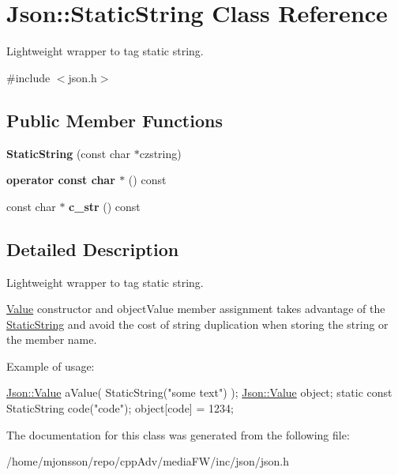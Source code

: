 \hypertarget{classJson_1_1StaticString}{}\section{Json\+:\+:Static\+String Class Reference}
\label{classJson_1_1StaticString}


Lightweight wrapper to tag static string.  




{\ttfamily \#include $<$json.\+h$>$}

\subsection*{Public Member Functions}
\begin{DoxyCompactItemize}
\item 
\mbox{\label{classJson_1_1StaticString_afb6baf1ec078ce76f0b0f9b39d19437f}} 
{\bfseries Static\+String} (const char $\ast$czstring)
\item 
\mbox{\label{classJson_1_1StaticString_a256a6cc0c630aef670848a0f11707b62}} 
{\bfseries operator const char $\ast$} () const
\item 
\mbox{\label{classJson_1_1StaticString_ad6be703d432d108623bb0aa06b0b90ca}} 
const char $\ast$ {\bfseries c\+\_\+str} () const
\end{DoxyCompactItemize}


\subsection{Detailed Description}
Lightweight wrapper to tag static string. 

\hyperlink{classJson_1_1Value}{Value} constructor and object\+Value member assignment takes advantage of the \hyperlink{classJson_1_1StaticString}{Static\+String} and avoid the cost of string duplication when storing the string or the member name.

Example of usage\+: 
\begin{DoxyCode}
\hyperlink{classJson_1_1Value}{Json::Value} aValue( StaticString(\textcolor{stringliteral}{"some text"}) );
\hyperlink{classJson_1_1Value}{Json::Value} object;
\textcolor{keyword}{static} \textcolor{keyword}{const} StaticString code(\textcolor{stringliteral}{"code"});
\textcolor{keywordtype}{object}[code] = 1234;
\end{DoxyCode}
 

The documentation for this class was generated from the following file\+:\begin{DoxyCompactItemize}
\item 
/home/mjonsson/repo/cpp\+Adv/media\+F\+W/inc/json/json.\+h\end{DoxyCompactItemize}
